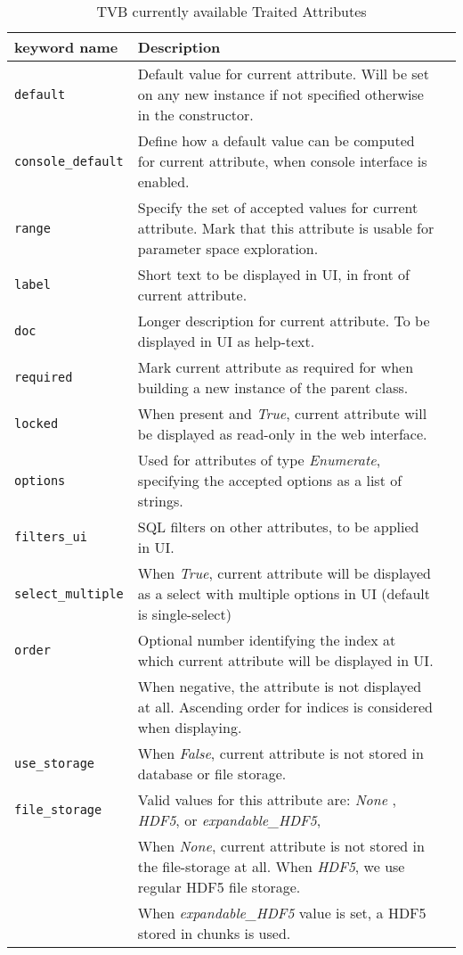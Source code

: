 \documentclass{bioinfo}
\begin{document}
\begin{center}
	\begin{table*}[ht]
		\begin{tabularx}{\textwidth}{lll}
			\toprule
			keyword name & Description  \\
			\midrule
			\texttt{default}          & Default value for current attribute. Will be set on any new instance if not specified otherwise in the constructor.  \\
			\texttt{console\_default} & Define how a default value can be computed for current attribute, when console interface is enabled. \\
			\texttt{range}            & Specify the set of accepted values for current attribute. Mark that this attribute is usable for parameter space exploration. \\
			\texttt{label}            & Short text to be displayed in UI, in front of current attribute. \\
			\texttt{doc}              & Longer description for current attribute. To be displayed in UI as help-text. \\
			\texttt{required}         & Mark current attribute as required for when building a new instance of the parent class. \\
			\texttt{locked}           & When present and \emph{True}, current attribute will be displayed as read-only in the web interface. \\
			\texttt{options}          & Used for attributes of type \emph{Enumerate}, specifying the accepted options as a list of strings. \\
			\texttt{filters\_ui}      & SQL filters on other attributes, to be applied in UI. \\
			\texttt{select\_multiple} & When \emph{True}, current attribute will be displayed as a select with multiple options in UI (default is single-select) \\
			\texttt{order}            & Optional number identifying the index at which current attribute will be displayed in UI. \\
						  & When negative, the attribute is not displayed at all. Ascending order for indices is considered when displaying. \\
			\texttt{use\_storage}     & When \emph{False}, current attribute is not stored in database or file storage. \\
			\texttt{file\_storage}    & Valid values for this attribute are: \emph{None} , \emph{HDF5}, or  \emph{expandable\_HDF5}, \\
						  & When \emph{None}, current attribute is not stored in the file-storage at all. When \emph{HDF5}, we use regular HDF5 file storage. \\
						  & When \emph{expandable\_HDF5} value is set, a HDF5 stored in chunks is used. \\
			\bottomrule
			\end{tabularx}
  	\caption{TVB currently available Traited Attributes}
  	\label{tab:traits}
	\end{table*}
\end{center}
\end{document}
